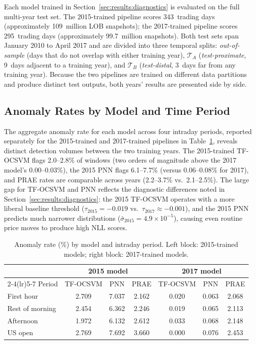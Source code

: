 \documentclass[11pt]{report}
\begin{document}
Each model trained in Section~\ref{sec:results:diagnostics} is evaluated on the full multi-year test set. The 2015-trained pipeline scores 343~trading days (approximately 109~million LOB snapshots); the 2017-trained pipeline scores 295~trading days (approximately 99.7~million snapshots). Both test sets span January 2010 to April 2017 and are divided into three temporal splits: \emph{out-of-sample} (days that do not overlap with either training year), $\mathcal{T}_A$ (\emph{test-proximate}, 9~days adjacent to a training year), and $\mathcal{T}_B$ (\emph{test-distal}, 3~days far from any training year). Because the two pipelines are trained on different data partitions and produce distinct test outputs, both years' results are presented side by side.

\subsection{Anomaly Rates by Model and Time Period}\label{sec:results:detection:rates}

The aggregate anomaly rate for each model across four intraday periods, reported separately for the 2015-trained and 2017-trained pipelines in Table~\ref{tab:anomaly_period}, reveals distinct detection volumes between the two training years. The 2015-trained TF-OCSVM flags 2.0--2.8\% of windows (two orders of magnitude above the 2017 model's 0.00--0.03\%), the 2015 PNN flags 6.1--7.7\% (versus 0.06--0.08\% for 2017), and PRAE rates are comparable across years (2.2--3.7\% vs.\ 2.1--2.5\%). The large gap for TF-OCSVM and PNN reflects the diagnostic differences noted in Section~\ref{sec:results:diagnostics}: the 2015 TF-OCSVM operates with a more liberal baseline threshold ($\tau_{2015} = -0.019$ vs.\ $\tau_{2017} \approx -0.001$), and the 2015 PNN predicts much narrower distributions ($\bar\sigma_{2015} = 4.9 \times 10^{-5}$), causing even routine price moves to produce high NLL scores.

\begin{table}[H]
\centering
\caption{Anomaly rate (\%) by model and intraday period.  Left block:
2015-trained models; right block: 2017-trained models.}
\label{tab:anomaly_period}
\small
\begin{tabular}{l ccc ccc}
\toprule
& \multicolumn{3}{c}{\textbf{2015 model}} & \multicolumn{3}{c}{\textbf{2017 model}} \\
\cmidrule(lr){2-4}\cmidrule(lr){5-7}
Period & TF-OCSVM & PNN & PRAE & TF-OCSVM & PNN & PRAE \\
\midrule
First hour        & 2.709 & 7.037 & 2.162 & 0.020 & 0.063 & 2.068 \\
Rest of morning   & 2.454 & 6.362 & 2.246 & 0.019 & 0.065 & 2.113 \\
Afternoon         & 1.972 & 6.132 & 2.612 & 0.033 & 0.068 & 2.148 \\
US open           & 2.769 & 7.692 & 3.660 & 0.000 & 0.076 & 2.453 \\
\bottomrule
\end{tabular}
\end{table}
\end{document}
